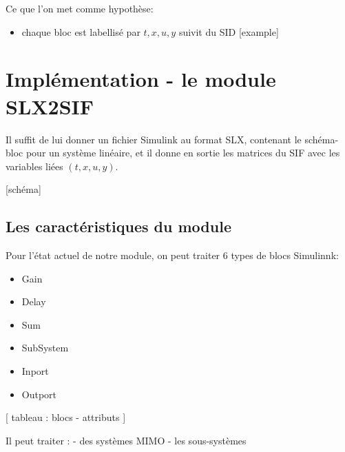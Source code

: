 Ce que l'on met comme hypothèse:
\begin{itemize}
\item chaque bloc est labellisé par $t, x, u, y$ suivit du SID [example] 
\end{itemize}



\section{Implémentation - le module SLX2SIF}

Il suffit de lui donner un fichier Simulink au format SLX, contenant le schéma-bloc pour un système linéaire, et il donne en sortie les matrices du SIF avec les variables liées $(t, x, u, y)$.

[schéma]

\subsection{Les caractéristiques du module}
Pour l'état actuel de notre module, on peut traiter 6 types de blocs Simulinnk:
\begin{itemize}
\item Gain
\item Delay
\item Sum
\item SubSystem
\item Inport
\item Outport
\end{itemize}

[ tableau : blocs - attributs ]

Il peut traiter :
 - des systèmes MIMO
 - les sous-systèmes
